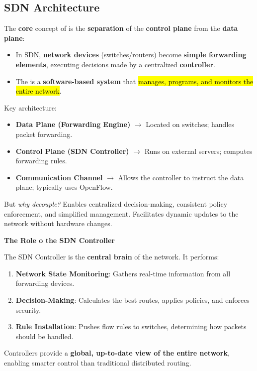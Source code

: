 \subsection{SDN Architecture}

The \textbf{core} concept of  is the \textbf{separation} of the \textbf{control plane} from the \textbf{data plane}:
\begin{itemize}
    \item In SDN, \textbf{network devices} (switches/routers) become \textbf{simple forwarding elements}, executing decisions made by a centralized \textbf{controller}.
    \item The  is a \textbf{software-based system} that \hl{manages, programs, and monitors the entire network}.
\end{itemize}
Key architecture:
\begin{itemize}
    \item \textbf{Data Plane (Forwarding Engine)} $\rightarrow$ Located on switches; handles packet forwarding.
    \item \textbf{Control Plane (SDN Controller)} $\rightarrow$ Runs on external servers; computes forwarding rules.
    \item \textbf{Communication Channel} $\rightarrow$ Allows the controller to instruct the data plane; typically uses OpenFlow.
\end{itemize}
But \emph{why decouple?} Enables centralized decision-making, consistent policy enforcement, and simplified management. Facilitates dynamic updates to the network without hardware changes.

\highspace
\begin{flushleft}
    \textcolor{Green3}{ \textbf{The Role o the SDN Controller}}
\end{flushleft}
The SDN Controller is the \textbf{central brain} of the network. It performs:
\begin{enumerate}[label=\textcolor{Green3}{\faIcon{check}}]
    \item \textcolor{Green3}{\textbf{Network State Monitoring}}: Gathers real-time information from all forwarding devices.
    \item \textcolor{Green3}{\textbf{Decision-Making}}: Calculates the best routes, applies policies, and enforces security.
    \item \textcolor{Green3}{\textbf{Rule Installation}}: Pushes flow rules to switches, determining how packets should be handled.
\end{enumerate}
Controllers provide a \textbf{global, up-to-date view of the entire network}, enabling smarter control than traditional distributed routing.


